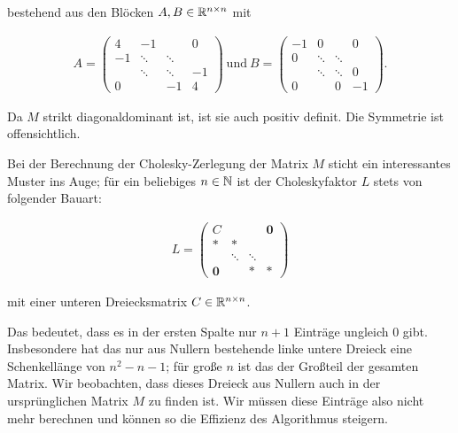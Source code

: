 \documentclass{article}
\begin{document}
bestehend aus den Blöcken $A,B \in \mathbb{R}^{n \times n}$ mit

\begin{align*}
    A = \left( \begin{array}{cccccc}                                
                4 & -1 && 0 \\
                -1 & \ddots & \ddots & \\
                & \ddots & \ddots & -1 \\
                0 && -1 & 4
         \end{array}
        \right)
\mathrm{~und~}
    B = \left(\begin{array}{cccccc}                                
                -1 & 0 && 0 \\
                0 & \ddots & \ddots & \\
                & \ddots & \ddots & 0 \\
                0 && 0 & -1
          \end{array}
        \right).
 \end{align*}

Da $M$ strikt diagonaldominant ist, ist sie auch positiv definit. Die Symmetrie ist offensichtlich. 

Bei der Berechnung der Cholesky-Zerlegung der Matrix $M$ sticht ein interessantes Muster ins Auge; für ein beliebiges $n \in \mathbb{N}$ ist der Choleskyfaktor $L$ stets von folgender Bauart:

\begin{align*}
    L = \left(\begin{array}{cccccc}                                
                C &&& \boldsymbol{0} \\
                \ast & \ast && \\
                & \ddots & \ddots & \\
                \boldsymbol{0} && \ast & \ast
           \end{array}
     \right)
\end{align*}

mit einer unteren Dreiecksmatrix $C \in \mathbb{R}^{n \times n}$.

Das bedeutet, dass es in der ersten Spalte nur $n+1$ Einträge ungleich 0 gibt. Insbesondere hat das nur aus Nullern bestehende linke untere Dreieck eine Schenkellänge von $n^{2}-n-1$; für große $n$ ist das der Großteil der gesamten Matrix. Wir beobachten, dass dieses Dreieck aus Nullern auch in der ursprünglichen Matrix $M$ zu finden ist. Wir müssen diese Einträge also nicht mehr berechnen und können so die Effizienz des Algorithmus steigern. 
\end{document}
